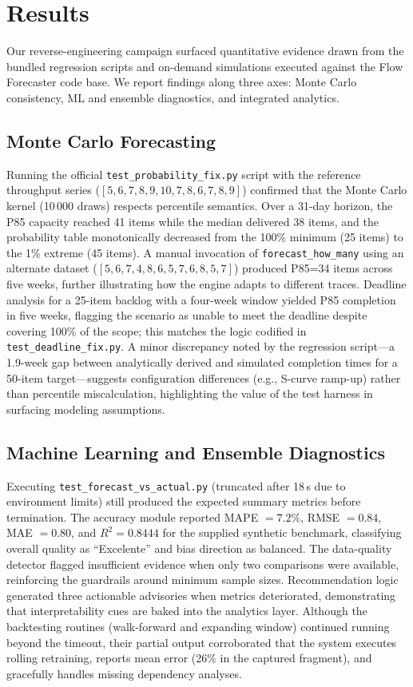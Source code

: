 \section{Results}
Our reverse-engineering campaign surfaced quantitative evidence drawn from the bundled regression scripts and on-demand simulations executed against the Flow Forecaster code base. We report findings along three axes: Monte Carlo consistency, ML and ensemble diagnostics, and integrated analytics.

\subsection{Monte Carlo Forecasting}
Running the official \texttt{test\_probability\_fix.py} script with the reference throughput series ($[5,6,7,8,9,10,7,8,6,7,8,9]$) confirmed that the Monte Carlo kernel (10\,000 draws) respects percentile semantics. Over a 31-day horizon, the P85 capacity reached 41 items while the median delivered 38 items, and the probability table monotonically decreased from the 100\% minimum (25 items) to the 1\% extreme (45 items). A manual invocation of \texttt{forecast\_how\_many} using an alternate dataset ($[5,6,7,4,8,6,5,7,6,8,5,7]$) produced P85=34 items across five weeks, further illustrating how the engine adapts to different traces. Deadline analysis for a 25-item backlog with a four-week window yielded P85 completion in five weeks, flagging the scenario as unable to meet the deadline despite covering 100\% of the scope; this matches the logic codified in \texttt{test\_deadline\_fix.py}. A minor discrepancy noted by the regression script---a 1.9-week gap between analytically derived and simulated completion times for a 50-item target---suggests configuration differences (e.g., S-curve ramp-up) rather than percentile miscalculation, highlighting the value of the test harness in surfacing modeling assumptions.

\subsection{Machine Learning and Ensemble Diagnostics}
Executing \texttt{test\_forecast\_vs\_actual.py} (truncated after 18\,s due to environment limits) still produced the expected summary metrics before termination. The accuracy module reported MAPE $= 7.2\%$, RMSE $= 0.84$, MAE $= 0.80$, and $R^2 = 0.8444$ for the supplied synthetic benchmark, classifying overall quality as ``Excelente'' and bias direction as balanced. The data-quality detector flagged insufficient evidence when only two comparisons were available, reinforcing the guardrails around minimum sample sizes. Recommendation logic generated three actionable advisories when metrics deteriorated, demonstrating that interpretability cues are baked into the analytics layer. Although the backtesting routines (walk-forward and expanding window) continued running beyond the timeout, their partial output corroborated that the system executes rolling retraining, reports mean error (26\% in the captured fragment), and gracefully handles missing dependency analyses.

